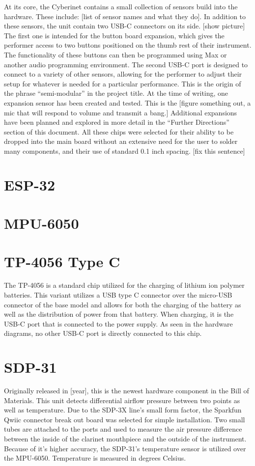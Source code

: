 At its core, the Cyberinet contains a small collection of sensors build into the hardware. These include: [list of sensor names and what they do]. In addition to these sensors, the unit contain two USB-C connectors on its side. [show picture] The first one is intended for the button board expansion, which gives the performer access to two buttons positioned on the thumb rest of their instrument. The functionality of these buttons can then be programmed using Max or another audio programming environment. The second USB-C port is designed to connect to a variety of other sensors, allowing for the performer to adjust their setup for whatever is needed for a particular performance. This is the origin of the phrase “semi-modular” in the project title. At the time of writing, one expansion sensor has been created and tested. This is the [figure something out, a mic that will respond to volume and transmit a bang.] Additional expansions have been planned and explored in more detail in the “Further Directions” section of this document. 
All these chips were selected for their ability to be dropped into the main board without an extensive need for the user to solder many components, and their use of standard 0.1 inch spacing. [fix this sentence]

\section{ESP-32}


\section{MPU-6050}


\section{TP-4056 Type C}
The TP-4056 is a standard chip utilized for the charging of lithium ion polymer batteries. This variant utilizes a USB type C connector over the micro-USB connector of the base model and allows for both the charging of the battery as well as the distribution of power from that battery. When charging, it is the USB-C port that is connected to the power supply. As seen in the hardware diagrams, no other USB-C port is directly connected to this chip.

\section{SDP-31}
Originally released in [year], this is the newest hardware component in the Bill of Materials. This unit detects differential airflow pressure between two points as well as temperature. Due to the SDP-3X line’s small form factor, the Sparkfun Qwiic connector break out board was selected for simple installation. Two small tubes are attached to the ports and used to measure the air pressure difference between the inside of the clarinet mouthpiece and the outside of the instrument.
Because of it’s higher accuracy, the SDP-31’s temperature sensor is utilized over the MPU-6050. Temperature is measured in degrees Celsius.


